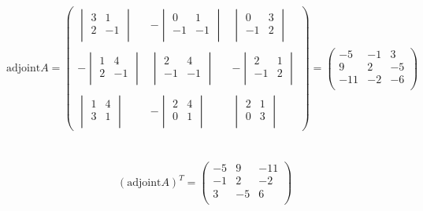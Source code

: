 \documentclass[11pt,a4paper]{article}
\begin{document}
$$\text{adjoint} A=
\begin{pmatrix}
\begin{vmatrix}
3 & 1\\
2 & -1\\
\end{vmatrix}
& -
\begin{vmatrix}
0 & 1\\
-1 & -1\\
\end{vmatrix}
& 
\begin{vmatrix}
0 & 3\\
-1 & 2\\
\end{vmatrix}\\\\
-
\begin{vmatrix}
1 & 4\\
2 & -1\\
\end{vmatrix}
&
\begin{vmatrix}
2 & 4\\
-1 & -1\\
\end{vmatrix}
& -
\begin{vmatrix}
2 & 1\\
-1 & 2\\
\end{vmatrix}\\\\
\begin{vmatrix}
1 & 4\\
3 & 1\\
\end{vmatrix}
& -
\begin{vmatrix}
2 & 4\\
0 & 1\\
\end{vmatrix}
&
\begin{vmatrix}
2 & 1\\
0 & 3\\
\end{vmatrix}
\end{pmatrix}
=
\begin{pmatrix}
-5 & -1 & 3\\
9 & 2 & -5\\
-11 & -2 & -6\\
\end{pmatrix}
$$\\\\


$$(\text{adjoint} A)^T=
\begin{pmatrix}
-5 & 9 & -11\\
-1 & 2 & -2\\
3 & -5 & 6\\
\end{pmatrix}
$$\\\\
\end{document}
